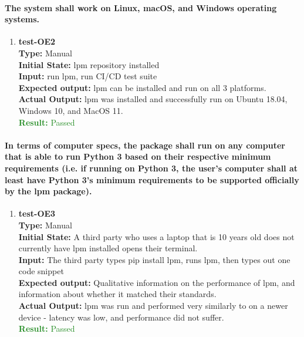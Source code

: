 \documentclass[12pt, titlepage]{article}
\begin{document}
\paragraph{The system shall work on Linux, macOS, and Windows operating systems.}
\begin{enumerate}
    \item{\textbf{test-OE2}\\}
    \textbf{Type:} Manual\\
    \textbf{Initial State:} lpm repository installed\\
    \textbf{Input:} run lpm, run CI/CD test suite\\
    \textbf{Expected output: } lpm can be installed and run on all 3 platforms. \\
    \textbf{Actual Output:} lpm was installed and successfully run on Ubuntu 18.04, Windows 10, and MacOS 11. \\
    \textcolor{ForestGreen}{\textbf{Result:} Passed}
\end{enumerate}

\paragraph{In terms of computer specs, the package shall run on any computer that is
able to run Python 3 based on their respective minimum requirements (i.e.
if running on Python 3, the user’s computer shall at least have Python 3’s minimum
requirements to be supported officially by the lpm package).}
\begin{enumerate}
    \item{\textbf{test-OE3}\\}
    \textbf{Type:} Manual\\
    \textbf{Initial State:} A third party who uses a laptop that is 10 years old does not currently have lpm installed opens their terminal.\\
    \textbf{Input:} The third party types pip install lpm, runs lpm, then types out one code snippet\\
    \textbf{Expected output: }  Qualitative information on the performance of lpm, and information about whether it matched their standards.\\
    \textbf{Actual Output:} lpm was run and performed very similarly to on a newer device - latency was low, and performance did not suffer. \\
    \textcolor{ForestGreen}{\textbf{Result:} Passed}
\end{enumerate}
\end{document}
